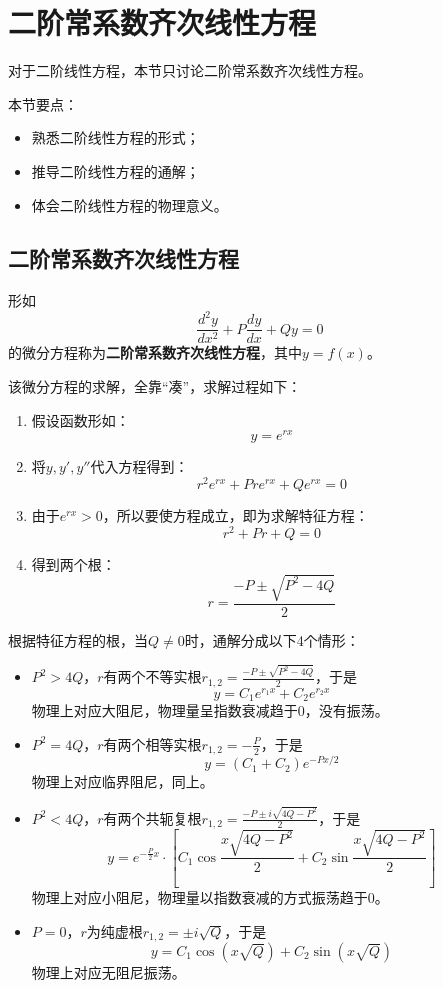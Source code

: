 \section{二阶常系数齐次线性方程}

对于二阶线性方程，本节只讨论二阶常系数齐次线性方程。

本节要点：
\begin{itemize}
    \item 熟悉二阶线性方程的形式；
    \item 推导二阶线性方程的通解；
    \item 体会二阶线性方程的物理意义。
\end{itemize}

\subsection{二阶常系数齐次线性方程}

\begin{definition}[二阶常系数齐次线性方程]
形如
\[
\frac{d^2y}{dx^2}+P\frac{dy}{dx}+Qy=0
\]
的微分方程称为{\bf 二阶常系数齐次线性方程}，其中$y=f\left( x \right) $。
\end{definition}

该微分方程的求解，全靠“凑”，求解过程如下：
\begin{enumerate}
    \item 假设函数形如：
    \[
    y=e^{rx}
    \]
    \item 将$y,y',y''$代入方程得到：
    \[
    r^2e^{rx}+Pre^{rx}+Qe^{rx}=0
    \]
    \item 由于$e^{rx}>0$，所以要使方程成立，即为求解特征方程：
    \[
    r^2+Pr+Q=0
    \]
    \item 得到两个根：
    \[
    r=\frac{-P\pm \sqrt{P^2-4Q}}{2}
    \]
\end{enumerate}

根据特征方程的根，当$Q\ne 0$时，通解分成以下4个情形：
\begin{itemize}
    \item $P^2>4Q$，$r$有两个不等实根$r_{1,2}=\frac{-P\pm \sqrt{P^2-4Q}}{2}$，于是
    \[
    y=C_1e^{r_1x}+C_2e^{r_2x}
    \]
    物理上对应大阻尼，物理量呈指数衰减趋于0，没有振荡。
    \item $P^2=4Q$，$r$有两个相等实根$r_{1,2}=-\frac{P}{2}$，于是
    \[
    y=\left( C_1+C_2 \right) e^{-Px/2}
    \]
    物理上对应临界阻尼，同上。
    \item $P^2<4Q$，$r$有两个共轭复根$r_{1,2}=\frac{-P\pm i\sqrt{4Q-P^2}}{2}$，于是
    \[
    y=e^{-\frac{P}{2}x}\cdot \left[ C_1\cos \frac{x\sqrt{4Q-P^2}}{2}+C_2\sin \frac{x\sqrt{4Q-P^2}}{2} \right]
    \]
    物理上对应小阻尼，物理量以指数衰减的方式振荡趋于0。
    \item $P=0$，$r$为纯虚根$r_{1,2}=\pm i\sqrt{Q}$，于是
    \[
    y=C_1\cos \left( x\sqrt{Q} \right) +C_2\sin \left( x\sqrt{Q} \right)
    \]
    物理上对应无阻尼振荡。
\end{itemize}

